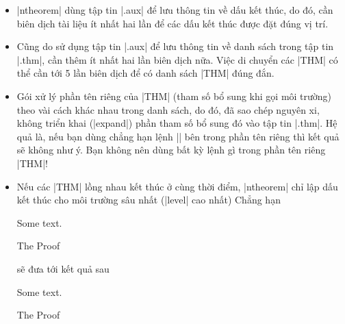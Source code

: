 \begin{itemize}
 \item
  |ntheorem| dùng tập tin |.aux| để lưu thông tin về dấu kết thúc,
  do đó, cần biên dịch tài liệu ít nhất hai lần để các dấu
  kết thúc được đặt đúng vị trí.
 \item
	Cũng do sử dụng tập tin |.aux| để lưu thông tin về danh sách
	trong tập tin |.thm|, cần thêm ít nhất hai lần biên dịch nữa.
	Việc di chuyển các |THM| có thể cần tới 5 lần biên dịch
	để có danh sách |THM| đúng đắn.
 \item
	Gói xử lý phần tên riêng của |THM| (tham số bổ sung khi gọi môi trường)
	theo vài cách khác nhau trong danh sách, do đó, đã sao chép nguyên xi,
	không triển khai (|expand|) phần tham số bổ sung đó vào tập tin |.thm|.
	Hệ quả là, nếu bạn dùng chẳng hạn lệnh |\thesection| bên trong phần tên
	riêng thì kết quả sẽ không như ý. Bạn không nên dùng bất kỳ lệnh gì
	trong phần tên riêng |THM|!
 \item
	Nếu các |THM| lồng nhau kết thúc ở cùng thời điểm,
	|ntheorem| chỉ lập dấu kết thúc cho môi trường sâu nhất (|level| cao nhất)
	Chẳng hạn
\begin{example}
  \begin{Lemma}
   Some text.
   \begin{Proof}
     The Proof
   \end{Proof}
  \end{Lemma}
\end{example}
sẽ đưa tới kết quả sau

\begin{thmbox}
 \begin{Lemma}
   Some text.
   \begin{Proof} The Proof \end{Proof}
 \end{Lemma}
\end{thmbox}


\end{itemize}
